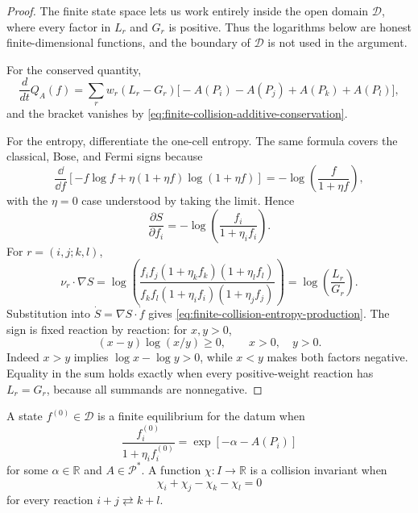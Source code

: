 \begin{proof}
The finite state space lets us work entirely inside the open domain
\(\mathcal D\), where every factor in \(L_r\) and \(G_r\) is positive.  Thus
the logarithms below are honest finite-dimensional functions, and the
boundary of \(\mathcal D\) is not used in the argument.

For the conserved quantity,
\[
  \frac{d}{dt}Q_A(f)
  =
  \sum_{r}w_r(L_r-G_r)
  \bigl[-A(P_i)-A(P_j)+A(P_k)+A(P_l)\bigr],
\]
and the bracket vanishes by
\eqref{eq:finite-collision-additive-conservation}.

For the entropy, differentiate the one-cell entropy.  The same formula covers
the classical, Bose, and Fermi signs because
\[
  \frac{\dd}{\dd f}
  \left[
    -f\log f+\eta(1+\eta f)\log(1+\eta f)
  \right]
  =
  -\log\!\left(\frac f{1+\eta f}\right),
\]
with the \(\eta=0\) case understood by taking the limit.  Hence
\begin{equation}
  \frac{\partial S}{\partial f_i}
  =
  -\log\!\left(\frac{f_i}{1+\eta_if_i}\right).
  \label{eq:finite-collision-entropy-derivative}
\end{equation}
For \(r=(i,j;k,l)\),
\[
  \nu_r\cdot\nabla S
  =
  \log\!\left(
  \frac{f_if_j(1+\eta_kf_k)(1+\eta_lf_l)}
       {f_kf_l(1+\eta_if_i)(1+\eta_jf_j)}
  \right)
  =
  \log\!\left(\frac{L_r}{G_r}\right).
  \]
Substitution into \(\dot S=\nabla S\cdot\dot f\) gives
\eqref{eq:finite-collision-entropy-production}.  The sign is fixed reaction
by reaction: for \(x,y>0\),
\[
  (x-y)\log(x/y)\ge0,\qquad x>0,\quad y>0 .
  \]
Indeed \(x>y\) implies \(\log x-\log y>0\), while \(x<y\) makes both factors
negative.  Equality in the sum holds exactly when every positive-weight
reaction has \(L_r=G_r\), because all summands are nonnegative.
\end{proof}

\begin{definition}
\label{def:finite-local-equilibrium-collision-invariants}
A state \(f^{(0)}\in\mathcal D\) is a finite equilibrium for the datum when
\begin{equation}
  \frac{f_i^{(0)}}{1+\eta_i f_i^{(0)}}
  =
  \exp[-\alpha-A(P_i)]
  \label{eq:finite-collision-equilibrium-form}
\end{equation}
for some \(\alpha\in\mathbb R\) and \(A\in\mathcal P^*\).  A function
\(\chi:I\to\mathbb R\) is a collision invariant when
\begin{equation}
  \chi_i+\chi_j-\chi_k-\chi_l=0
  \label{eq:finite-collision-invariant}
\end{equation}
for every reaction \(i+j\rightleftarrows k+l\).
\end{definition}

